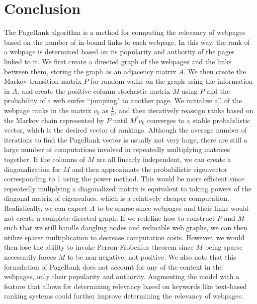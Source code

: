 \documentclass[11pt]{article}
\theoremstyle{definition}
\begin{document}
\section{Conclusion}
The PageRank algorithm is a method for computing the relevancy of webpages based on the number of in-bound links to each webpage. In this way, the rank of a webpage is determined based on its popularity and authority of the pages linked to it.
We first create a directed graph of the webpages and the links between them, storing the graph as an adjacency matrix $A$. We then create the Markov transition matrix $P$ for random walks on the graph using the information in $A$, and create the positive column-stochastic matrix $M$ using $P$ and the probability of a web surfer ``jumpiing" to another page.
We initialize all of the webpage ranks in the matrix $v_0$ as $\frac{1}{n}$, and then iteratively reassign ranks based on the Markov chain represented by $P$ until $M^tv_0$ converges to a stable probabilistic vector, which is the desired vector of rankings.
Although the average number of iterations to find the PageRank vector is usually not very large, there are still a large number of computations involved in repeatedly multiplying matrices together.
If the columns of $M$ are all linearly independent, we can create a diagonalization for $M$ and then approximate the probabilistic eigenvector corresponding to 1 using the power method. This would be more efficient since repeatedly muliplying a diagonalized matrix is equivalent to taking powers of the diagonal matrix of eigenvalues, which is a relatively cheaper computation.
Realistically, we can expect $A$ to be sparse since webpages and their links would not create a complete directed graph. If we redefine how to construct $P$ and $M$ such that we still handle dangling nodes and reducible web graphs, we can then utilize sparse multiplication to decrease computation costs. However, we would then lose the ability to invoke Perron-Frobenius theorem since $M$ being sparse necessarily forces $M$ to be non-negative, not positive.
We also note that this formulation of PageRank does not account for any of the content in the webpages, only their popularity and authority. Augmenting the model with a feature that allows for determining relevancy based on keywords like text-based ranking systems could further improve determining the relevancy of webpages.
\end{document}
